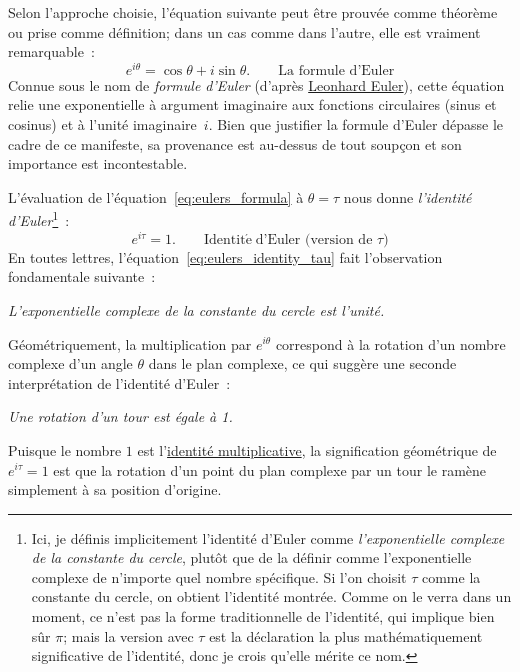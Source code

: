 Selon l'approche choisie, l'équation suivante peut être prouvée comme
théorème ou prise comme définition\ns; dans un cas comme dans l'autre, elle est vraiment remarquable~:
\begin{equation}
\label{eq:eulers_formula}
e^{i\theta} = \cos\theta + i\sin\theta. \qquad\mbox{La formule d'Euler}
\end{equation}
Connue sous le nom de \emph{formule d'Euler} (d'après
\href{https://fr.wikipedia.org/wiki/Leonhard_Euler}{Leonhard Euler}), cette
équation relie une exponentielle à argument imaginaire aux fonctions circulaires
(sinus et cosinus) et à l'unité imaginaire~$i$. Bien que justifier la formule
d'Euler dépasse le cadre de ce manifeste, sa provenance est au-dessus de tout
soupçon et son importance est incontestable.

L'évaluation de l'équation~\eqref{eq:eulers_formula} à $\theta = \tau$ nous donne
\emph{l'identité d'Euler}\ns\footnote{Ici, je définis implicitement l'identité
d'Euler comme \emph{l'exponentielle complexe de la constante du cercle}, plutôt
que de la définir comme l'exponentielle complexe de n'importe quel nombre spécifique. Si l'on
choisit $\tau$ comme la constante du cercle, on obtient l'identité montrée.
Comme on le verra dans un moment, ce n'est pas la forme traditionnelle de l'identité,
qui implique bien sûr $\pi$\ns; mais la version avec $\tau$ est la déclaration
la plus mathématiquement significative de l'identité, donc je crois qu'elle
mérite ce nom.}~:
\begin{equation}
\label{eq:eulers_identity_tau}
e^{i\tau} = 1. \qquad\mathrm{Identit\acute{e}}\; \mbox{d'Euler (version de $\tau$)}
\end{equation}
En toutes lettres, l'équation~\eqref{eq:eulers_identity_tau} fait l'observation
fondamentale suivante~:

\begin{center}
\emph{L'exponentielle complexe de la constante du cercle est l'unité.}
\end{center}

Géométriquement, la multiplication par $e^{i\theta}$ correspond à la rotation
d'un nombre complexe d'un angle $\theta$ dans le plan complexe, ce qui suggère
une seconde interprétation de l'identité d'Euler~:

\begin{center}
\emph{Une rotation d'un tour est égale à 1.}
\end{center}

\noindent Puisque le nombre $1$ est
l'\href{https://fr.wikipedia.org/wiki/%C3%89l%C3%A9ment_neutre}{identité
multiplicative}, la signification géométrique de $e^{i\tau} = 1$ est que la
rotation d'un point du plan complexe par un tour le ramène simplement à sa
position d'origine.


